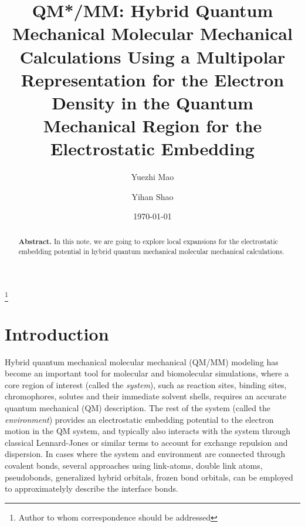 \documentclass[aip,jcp,preprint,superscriptaddress,amsmath,amssymb]{revtex4-1}
\begin{document}
\title{QM*/MM: Hybrid Quantum Mechanical Molecular Mechanical Calculations Using a Multipolar Representation for the Electron Density in the Quantum Mechanical Region for the Electrostatic Embedding}

\author{Yuezhi Mao}

\author{Yihan Shao}
\thanks{Author to whom correspondence should be addressed}

\date{\today}

\begin{abstract}
\textbf{Abstract.}    
In this note, we are going to explore local expansions for the electrostatic embedding potential 
in hybrid quantum mechanical molecular mechanical calculations. 
\end{abstract}

\maketitle

\section{Introduction}

Hybrid quantum mechanical molecular mechanical (QM/MM) modeling has become an important tool for molecular and biomolecular simulations, 
where a core region of interest (called the \emph{system}), such as reaction sites, binding sites, chromophores, solutes and their immediate solvent shells, 
requires an accurate quantum mechanical (QM) description.
The rest of the system (called the \emph{environment}) provides an electrostatic embedding potential to the electron motion in the QM system, 
and typically also interacts with the system through classical Lennard-Jones or similar terms to account for exchange repulsion and dispersion.  
In cases where the system and environment are connected through covalent bonds, 
several approaches using link-atoms, double link atoms, pseudobonds, generalized hybrid orbitals, 
frozen bond orbitals, can be employed to approximatelyly describe the interface bonds. 
\end{document}
